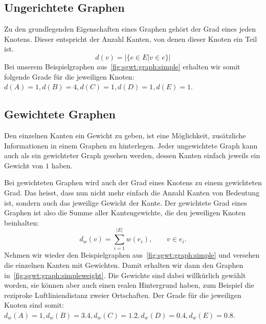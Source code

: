 \subsection{Ungerichtete Graphen}

Zu den grundlegenden Eigenschaften eines Graphen geh\"ort der Grad eines jeden 
Knotens. Dieser entspricht der Anzahl Kanten, von denen dieser Knoten ein 
Teil ist.
\begin{equation*}
    d(v) = | \{e \in E | v \in e \} |
\end{equation*}
Bei unserem Beispielgraphen aus~\cref{fig:sgwt:graph:simple} 
erhalten wir somit folgende Grade f\"ur die jeweiligen Knoten: $d(A) = 1, d(B) 
= 4, d(C) = 1, d(D) = 1, d(E) = 1$.

\subsection{Gewichtete Graphen}

Den einzelnen Kanten ein Gewicht zu geben, ist eine M\"oglichkeit, 
zus\"atzliche Informationen in einem Graphen zu hinterlegen. Jeder ungewichtete 
Graph kann auch als ein gewichteter Graph gesehen werden, dessen Kanten einfach 
jeweils ein Gewicht von $1$ haben.

Bei gewichteten Graphen wird auch der Grad eines Knotens zu einem gewichteten 
Grad. Das heisst, dass nun nicht mehr einfach die Anzahl Kanten von Bedeutung 
ist, sondern auch das jeweilige Gewicht der Kante. Der gewichtete Grad eines 
Graphen ist also die Summe aller Kantengewichte, die den jeweiligen Knoten 
beinhalten:
\begin{equation*}
    d_w(v) = \sum_{i = 1}^{|E|}w(e_i), \qquad v \in e_i.
\end{equation*}
Nehmen wir wieder den Beispielgraphen aus~\cref{fig:sgwt:graph:simple} und 
versehen die einzelnen Kanten mit Gewichten. Damit erhalten wir dann den 
Graphen in~\cref{fig:sgwt:graph:simpleweight}. Die Gewichte sind dabei 
willk\"urlich gew\"ahlt worden, sie k\"onnen aber auch einen realen Hintergrund 
haben, zum Beispiel die reziproke Luftliniendistanz zweier Ortschaften. Der 
Grade f\"ur die jeweiligen Knoten sind somit: $d_w(A) = 1, d_w(B) = 3.4, d_w(C) 
= 1.2, d_w(D) = 0.4, d_w(E) = 0.8$.

